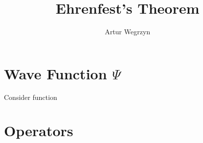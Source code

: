 \documentclass[12pt]{article}
\begin{document}
\title{Ehrenfest's Theorem}
\author{Artur Wegrzyn}
\maketitle

\abstract{}


\tableofcontents

\section{Wave Function $\Psi$}
Consider function $$

\section{Operators }
\end{document}
